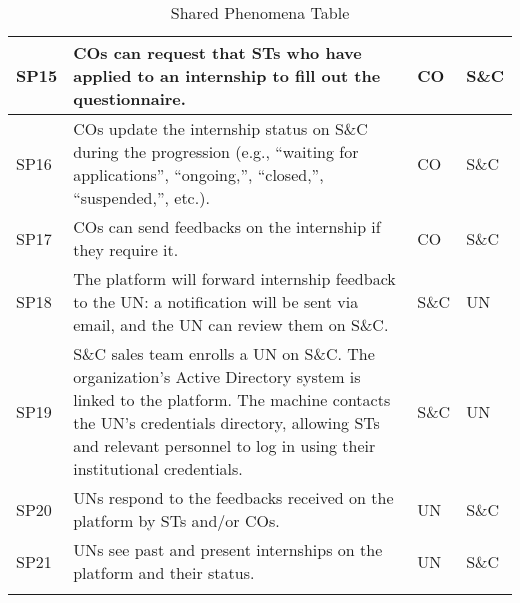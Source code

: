 \begin{longtable}{|l|p{}|l|l|}
    \hline
    SP15               & COs can request that STs who have applied to an internship to fill out the questionnaire.                                                                                                                                                             & CO                  & S\&C              \\
    \hline
    SP16               & COs update the internship status on S\&C during the progression (e.g., “waiting for applications”, “ongoing,”, “closed,”, “suspended,”, etc.).                                                                                                        & CO                  & S\&C              \\
    \hline
    SP17               & COs can send feedbacks on the internship if they require it.                                                                                                                                                                                          & CO                  & S\&C              \\
    \hline
    SP18               & The platform will forward internship feedback to the UN: a notification will be sent via email, and the UN can review them on S\&C.                                                                                                                   & S\&C                & UN                \\
    \hline
    SP19               & S\&C sales team enrolls a UN on S\&C. The organization's Active Directory system is linked to the platform. The machine contacts the UN's credentials directory, allowing STs and relevant personnel to log in using their institutional credentials. & S\&C                & UN                \\
    \hline
    SP20               & UNs respond to the feedbacks received on the platform by STs and/or COs.                                                                                                                                                                              & UN                  & S\&C              \\
    \hline
    SP21               & UNs see past and present internships on the platform and their status.                                                                                                                                                                                & UN                  & S\&C              \\
    \hline
    \caption{Shared Phenomena Table}
    \label{tab:shared-phenomena}
\end{longtable}

